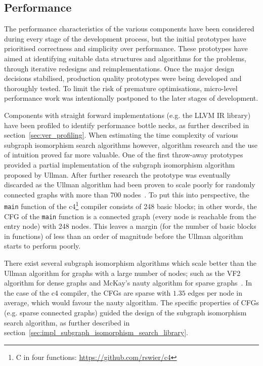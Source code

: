 
\subsection{Performance}
\label{sec:ver_performance}

The performance characteristics of the various components have been considered during every stage of the development process, but the initial prototypes have prioritised correctness and simplicity over performance. These prototypes have aimed at identifying suitable data structures and algorithms for the problems, through iterative redesigns and reimplementations. Once the major design decisions stabilised, production quality prototypes were being developed and thoroughly tested. To limit the risk of premature optimisations, micro-level performance work was intentionally postponed to the later stages of development.

Components with straight forward implementations (e.g. the LLVM IR library) have been profiled to identify performance bottle necks, as further described in section~\ref{sec:ver_profiling}. When estimating the time complexity of various subgraph isomorphism search algorithms however, algorithm research and the use of intuition proved far more valuable. One of the first throw-away prototypes provided a partial implementation of the subgraph isomorphism algorithm proposed by Ullman. After further research the prototype was eventually discarded as the Ullman algorithm had been proven to scale poorly for randomly connected graphs with more than 700 nodes~\cite{iso_performance_comparison}. To put this into perspective, the \texttt{main} function of the c4\footnote{C in four functions: \url{https://github.com/rswier/c4}} compiler consists of 248 basic blocks; in other words, the CFG of the \texttt{main} function is a connected graph (every node is reachable from the entry node) with 248 nodes. This leaves a margin (for the number of basic blocks in functions) of less than an order of magnitude before the Ullman algorithm starts to perform poorly.

There exist several subgraph isomorphism algorithms which scale better than the Ullman algorithm for graphs with a large number of nodes; such as the VF2 algorithm for dense graphs and McKay's nauty algorithm for sparse graphs~\cite{iso_performance_comparison,subgraph_isomorphism_algorithms}. In the case of the c4 compiler, the CFGs are sparse with $ 1.35 $ edges per node in average, which would favour the nauty algorithm. The specific properties of CFGs (e.g. sparse connected graphs) guided the design of the subgraph isomorphism search algorithm, as further described in section~\ref{sec:impl_subgraph_isomorphism_search_library}.

